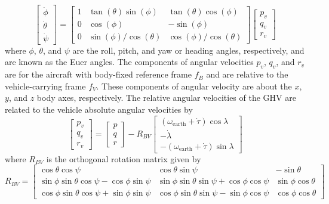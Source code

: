 \begin{equation}
  \label{eulr_ss_eqn}
  \left[
  \begin{array}{c}
    \dot{\phi} \\
    \dot{\theta} \\
    \dot{\psi}
  \end{array}\right]=
  \left[
  \begin{array}{ccc}
    1 & \tan(\theta)\sin(\phi) & \tan(\theta)\cos(\phi) \\
    0 & \cos(\phi) & -\sin(\phi) \\
    0 & \sin(\phi)/\cos(\theta) & \cos(\phi)/\cos(\theta)
  \end{array}\right]
  \left[
  \begin{array}{c}
    p_{v} \\
    q_{v} \\
    r_{v}
  \end{array}\right]
\end{equation}
where $\phi$, $\theta$, and $\psi$ are the roll, pitch, and yaw or heading angles, respectively, and are known as the Euer angles.
The components of angular velocities $p_{v}$, $q_{v}$, and $r_{v}$ are for the aircraft with body-fixed reference frame $f_{B}$ and are relative to the vehicle-carrying frame $f_{V}$.
These components of angular velocity are about the $x$, $y$, and $z$ body axes, respectively.
The relative angular velocities of the GHV are related to the vehicle absolute angular velocities by
\begin{equation}
  \begin{bmatrix}
    p_{v} \\
    q_{v} \\
    r_{v}
  \end{bmatrix}=
  \begin{bmatrix}
    p \\
    q \\
    r
  \end{bmatrix}-R_{BV}
  \begin{bmatrix}
    (\omega_{\text{earth}}+\dot{\tau})\cos{\lambda} \\
    -\dot{\lambda} \\
    -(\omega_{\text{earth}}+\dot{\tau})\sin{\lambda}
  \end{bmatrix}
\end{equation}
where $R_{BV}$ is the orthogonal rotation matrix given by
\begin{equation}
  R_{BV}=
  \begin{bmatrix}
    \cos{\theta}\cos{\psi} & \cos{\theta}\sin{\psi} & -\sin{\theta} \\
    \sin{\phi}\sin{\theta}\cos{\psi}-\cos{\phi}\sin{\psi} & \sin{\phi}\sin{\theta}\sin{\psi}+\cos{\phi}\cos{\psi} & \sin{\phi}\cos{\theta}\\
    \cos{\phi}\sin{\theta}\cos{\psi}+\sin{\phi}\sin{\psi} & \cos{\phi}\sin{\theta}\sin{\psi}-\sin{\phi}\cos{\psi} & \cos{\phi}\cos{\theta}
  \end{bmatrix}
\end{equation}

